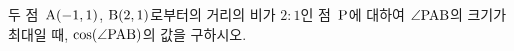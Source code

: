두 점~$\mathrm{A}(-1{,}\mkern3mu\mathopen{}1)$, $\mathrm{B}(2{,}\mkern3mu\mathopen{}1)$로부터의 거리의 비가 $2:1$인 점~$\mathrm{P}$에 대하여 $\angle\mathrm{PAB}$의 크기가 최대일 때, $\cos(\angle\mathrm{PAB})$의 값을 구하시오.
